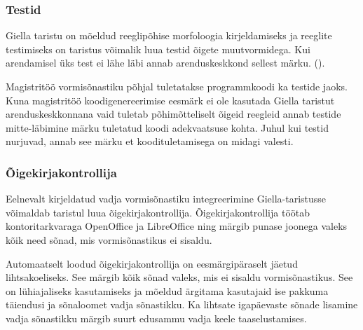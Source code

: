 \documentclass[12pt,a4paper]{article}
\begin{document}
\subsubsection{Testid}
\label{sec:giella-testid}

Giella taristu on mõeldud reeglipõhise morfoloogia kirjeldamiseks ja reeglite testimiseks on taristus võimalik luua testid õigete muutvormidega. Kui arendamisel üks test ei lähe läbi annab arendus\-keskkond sellest märku. (\cite[347]{moshagen_building_2013}). %

Magistritöö vormisõnastiku põhjal tuletatakse programm\-koodi ka testide jaoks. Kuna magistritöö koodi\-genereerimise eesmärk ei ole kasutada Giella taristut arendus\-keskkonnana vaid tuletab põhimõtteliselt õigeid reegleid annab testide mitte-läbimine märku tuletatud koodi adekvaatsuse kohta. Juhul kui testid nurjuvad, annab see märku et koodi\-tuletamisega on midagi valesti.

\subsubsection{Õigekirjakontrollija}
\label{sec:giella-õigekirjakontrollija}

Eelnevalt kirjeldatud vadja vormisõnastiku integreerimine Giella-taristusse võimaldab taristul luua õige\-kirja\-kontrollija. Õige\-kirja\-kontrollija töötab kontori\-tarkvaraga OpenOffice ja LibreOffice ning märgib punase joonega valeks kõik need sõnad, mis vormi\-sõnastikus ei sisaldu.


Automaatselt loodud õigekirjakontrollija on eesmärgipäraselt jäetud lihtsakoeliseks. See märgib kõik sõnad valeks, mis ei sisaldu vormi\-sõnastikus. See on lühiajaliseks kasutamiseks ja mõeldud ärgitama kasutajaid ise pakkuma täiendusi ja sõnaloomet vadja sõnastikku. Ka lihtsate igapäevaste sõnade lisamine vadja sõnastikku märgib suurt edu\-sammu vadja keele taas\-elustamises.



\end{document}
